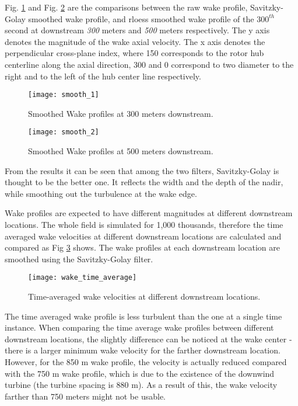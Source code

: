 \documentclass{umthesis}
\begin{document}
Fig. \ref{fig:smooth_1} and Fig. \ref{fig:smooth_2} are the comparisons between the raw wake profile, Savitzky-Golay smoothed wake profile, and rloess smoothed wake profile of the $300^{th}$ second at downstream \textit{300} meters and \textit{500} meters respectively. The y axis denotes the magnitude of the wake axial velocity. The x axis denotes the perpendicular cross-plane index, where 150 corresponds to the rotor hub centerline along the axial direction, 300 and 0 correspond to two diameter to the right and to the left of the hub center line respectively.

\begin{figure}
  \centering
  \texttt{[image: smooth\_1]}
  \caption{Smoothed Wake profiles at 300 meters downstream.}\label{fig:smooth_1}
\end{figure}

\begin{figure}
  \centering
  \texttt{[image: smooth\_2]}
  \caption{Smoothed Wake profiles at 500 meters downstream.}\label{fig:smooth_2}
\end{figure}

From the results it can be seen that among the two filters, Savitzky-Golay is thought to be the better one. It reflects the width and the depth of the nadir, while smoothing out the turbulence at the wake edge. 

Wake profiles are expected to have different magnitudes at different downstream locations. The whole field is simulated for 1,000 thousands, therefore the time averaged wake velocities at different downstream locations are calculated and compared as Fig  \ref{fig:wake_time_average} shows. The wake profiles at each downstream location are smoothed using the Savitzky-Golay filter. 

\begin{figure}
  \centering
  \texttt{[image: wake\_time\_average]}
  \caption{Time-averaged wake velocities at different downstream locations.}\label{fig:wake_time_average}
\end{figure}

The time averaged wake profile is less turbulent than the one at a single time instance. When comparing the time average wake profiles between different downstream locations, the slightly difference can be noticed at the wake center - there is a larger minimum wake velocity for the farther downstream location. However, for the 850 m wake profile, the velocity is actually reduced compared with the 750 m wake profile, which is due to the existence of the downwind turbine (the turbine spacing is 880 m). As a result of this, the wake velocity farther than 750 meters might not be usable.
\end{document}
